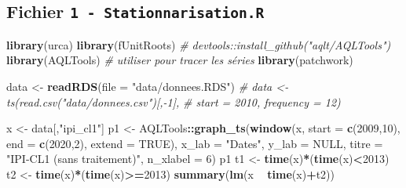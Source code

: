 \documentclass[french]{article}
\newenvironment{Shaded}{\begin{snugshade}}{\end{snugshade}}
\newcommand{\CommentTok}[1]{\textcolor[rgb]{0.56,0.35,0.01}{\textit{#1}}}
\newcommand{\DataTypeTok}[1]{\textcolor[rgb]{0.13,0.29,0.53}{#1}}
\newcommand{\DecValTok}[1]{\textcolor[rgb]{0.00,0.00,0.81}{#1}}
\newcommand{\KeywordTok}[1]{\textcolor[rgb]{0.13,0.29,0.53}{\textbf{#1}}}
\newcommand{\NormalTok}[1]{#1}
\newcommand{\OperatorTok}[1]{\textcolor[rgb]{0.81,0.36,0.00}{\textbf{#1}}}
\newcommand{\OtherTok}[1]{\textcolor[rgb]{0.56,0.35,0.01}{#1}}
\newcommand{\StringTok}[1]{\textcolor[rgb]{0.31,0.60,0.02}{#1}}
\begin{document}
\hypertarget{fichier-1---stationnarisation.r}{%
\subsection{\texorpdfstring{Fichier \texttt{1\ -\ Stationnarisation.R}}{Fichier 1 - Stationnarisation.R}}\label{fichier-1---stationnarisation.r}}

\begin{Shaded}
\begin{Highlighting}[]
\KeywordTok{library}\NormalTok{(urca)}
\KeywordTok{library}\NormalTok{(fUnitRoots)}
\CommentTok{# devtools::install_github("aqlt/AQLTools")}
\KeywordTok{library}\NormalTok{(AQLTools) }\CommentTok{# utiliser pour tracer les séries}
\KeywordTok{library}\NormalTok{(patchwork)}

\NormalTok{data <-}\StringTok{ }\KeywordTok{readRDS}\NormalTok{(}\DataTypeTok{file =} \StringTok{"data/donnees.RDS"}\NormalTok{)}
\CommentTok{# data <- ts(read.csv("data/donnees.csv")[,-1],}
\CommentTok{#          start = 2010, frequency = 12)}


\NormalTok{x <-}\StringTok{ }\NormalTok{data[,}\StringTok{"ipi_cl1"}\NormalTok{]}
\NormalTok{p1 <-}\StringTok{ }\NormalTok{AQLTools}\OperatorTok{::}\KeywordTok{graph_ts}\NormalTok{(}\KeywordTok{window}\NormalTok{(x,}
                                \DataTypeTok{start =} \KeywordTok{c}\NormalTok{(}\DecValTok{2009}\NormalTok{,}\DecValTok{10}\NormalTok{),}
                                \DataTypeTok{end =} \KeywordTok{c}\NormalTok{(}\DecValTok{2020}\NormalTok{,}\DecValTok{2}\NormalTok{),}
                                \DataTypeTok{extend =} \OtherTok{TRUE}\NormalTok{), }\DataTypeTok{x_lab =} \StringTok{"Dates"}\NormalTok{, }\DataTypeTok{y_lab =} \OtherTok{NULL}\NormalTok{,}
                         \DataTypeTok{titre =} \StringTok{"IPI-CL1 (sans traitement)"}\NormalTok{, }\DataTypeTok{n_xlabel =} \DecValTok{6}\NormalTok{)}
\NormalTok{p1}
\NormalTok{t1 <-}\StringTok{ }\KeywordTok{time}\NormalTok{(x)}\OperatorTok{*}\NormalTok{(}\KeywordTok{time}\NormalTok{(x)}\OperatorTok{<}\DecValTok{2013}\NormalTok{)}
\NormalTok{t2 <-}\StringTok{ }\KeywordTok{time}\NormalTok{(x)}\OperatorTok{*}\NormalTok{(}\KeywordTok{time}\NormalTok{(x)}\OperatorTok{>=}\DecValTok{2013}\NormalTok{)}
\KeywordTok{summary}\NormalTok{(}\KeywordTok{lm}\NormalTok{(x }\OperatorTok{~}\StringTok{ }\KeywordTok{time}\NormalTok{(x)}\OperatorTok{+}\NormalTok{t2))}


\end{Highlighting}
\end{Shaded}
\end{document}
